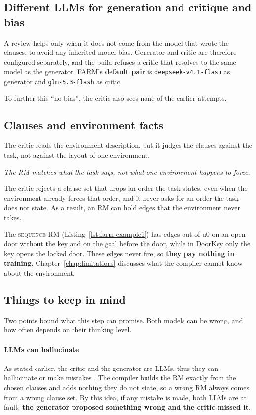 \documentclass[11pt,english,listoffigures,listoftables]{tfgetsinf}
\newcommand{\runex}[1]{\textsc{#1}}  %
\newcommand{\keyidea}[1]{\par\smallskip\noindent\hspace*{0.6em}{\color{gray!55}\vrule width 1.5pt}\hspace{8pt}\parbox[t]{\dimexpr\linewidth-0.6em-9.5pt\relax}{\itshape #1}\par\smallskip}  %
\begin{document}
\subsection{Different LLMs for generation and critique and bias}
A review helps only when it does not come from the model that wrote the clauses, to avoid any inherited model bias. Generator and critic are therefore configured separately, and the build refuses a critic that resolves to the same model as the generator. FARM's \textbf{default pair} is \texttt{deepseek-v4.1-flash} as generator and \texttt{glm-5.3-flash} as critic.

\noindent To further this ``no-bias'', the critic also sees none of the earlier attempts.

\subsection{Clauses and environment facts}
The critic reads the environment description, but it judges the clauses against the task, not against the layout of one environment.

\keyidea{The RM matches what the task says, not what one environment happens to force.}
\noindent The critic rejects a clause set that drops an order the task states, even when the environment already forces that order, and it never asks for an order the task does not state. As a result, an RM can hold edges that the environment never takes.

The \runex{sequence} RM (Listing~\ref{lst:farm-example1}) has edges out of u0 on an open door without the key and on the goal before the door, while in DoorKey only the key opens the locked door. These edges never fire, so \textbf{they pay nothing in training}. Chapter~\ref{chap:limitations} discusses what the compiler cannot know about the environment.

\subsection{Things to keep in mind}
Two points bound what this step can promise. Both models can be wrong, and how often depends on their thinking level.

\paragraph{LLMs can hallucinate} As stated earlier, the critic and the generator are LLMs, thus they can hallucinate or make mistakes \cite{huang2025survey}. The compiler builds the RM exactly from the chosen clauses and adds nothing they do not state, so a wrong RM always comes from a wrong clause set. By this idea, if any mistake is made, both LLMs are at fault: \textbf{the generator proposed something wrong and the critic missed it}.
\end{document}
